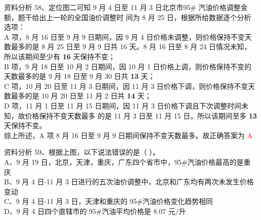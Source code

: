 \documentclass[aspectratio=169]{beamer}
\begin{document}
\begin{frame}[t]{资料分析}
    58、定位图二可知 9 月 4 日至 11 月 3 日北京市95\# 汽油价格调整金额，题干给出上一轮的全国油价调整时
    间为 8 月 25 日，根据所给数据逐个分析选项：\\

    A 项，8 月 16 日至 9 月 9 日期间，因 9 月 4 日价格未调整，则价格保持不变天数最多的是 8 月 25 日至 9
    月 9 日共 16 天。8 月 16 日至 8 月 24 日情况未知，所以该期间至少有 \textbf{16} 天保持不变；\\

    B 项，9 月 18 日至 10 月 2 日期间，因 10 月 1 日价格上调，则价格保持不变的天数最多的是 9 月 18 日至 9
    月 30 日共 \textbf{13} 天；\\

    C 项，10 月 20 日至 11 月 3 日期间，因 11 月 3 日价格下调，则价格保持不变天数最多的是 10 月 20 日至
    11 月 2 日共 \textbf{14} 天；\\

    D 项，11 月 1 日至 11 月 15 日期间，因 11 月 3 日价格下调且下次调整时间未知，故价格保持不变天数最多
    的是 11 月 3 日至 11 月 15 日，所以该期间至多 \textbf{13} 天保持不变。\\

    综上所述，A 项 8 月 16 日至 9 月 9 日期间保持不变天数最多。故正确答案为 \textcolor{red}{A}\\

\end{frame}                           









\begin{frame}[t]{资料分析}
    59、根据上图，以下说法错误的是（ ）。                                          \\
    A、9 月 19 日，北京，天津，重庆，广东四个省市中，95\#汽油价格最高的是重庆       \\
    B、9 月 4 日-11 月 3 日进行的五次油价调整中，北京和广东均有两次未发生价格变动  \\
    C、9 月 4 日-11 月 3 日，天津和重庆的 95\#汽油价格变化趋势相同                  \\
    D、9 月 4 日四个直辖市的 95\#汽油平均价格是 8.07 元/升                          \\
\end{frame}                           
\end{document}
